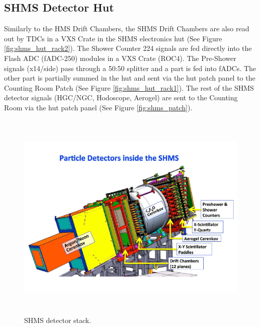 \documentclass[11pt]{article}
\begin{document}
\subsection{SHMS Detector Hut}
Similarly to the HMS Drift Chambers, the SHMS Drift Chambers are also read out by TDCs in a VXS Crate in the SHMS electronics hut (See Figure \ref{fig:shms_hut_rack2}).
The Shower Counter 224 signals are fed directly into the Flash ADC (fADC-250) modules in a VXS Crate (ROC4). The Pre-Shower signals (x14/side) pass
through a 50:50 splitter and a part is fed into fADCs. The other part is partially summed in the hut and sent via the hut patch panel to the
Counting Room Patch (See Figure \ref{fig:shms_hut_rack1}). The rest of the SHMS detector signals (HGC/NGC, Hodoscope, Aerogel) are sent to the Counting Room via the hut patch panel (See Figure \ref{fig:shms_patch}). 
\newpage
\begin{figure}[h!]
  \centering
  \includegraphics[width=6.0in, height=4.0in]{images/SHMS_stack.pdf}
  \caption{SHMS detector stack.}
  \label{fig:shms_stack}
\end{figure}
\end{document}
